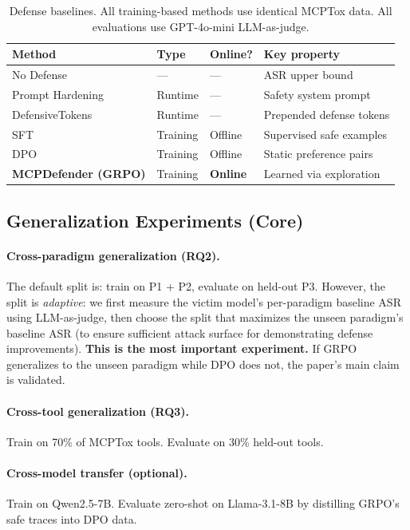 \documentclass[11pt,a4paper]{article}
\begin{document}
\begin{table}[h]
\centering
\small
\begin{tabular}{llll}
\toprule
\textbf{Method} & \textbf{Type} & \textbf{Online?} & \textbf{Key property} \\
\midrule
No Defense & --- & --- & ASR upper bound \\
Prompt Hardening & Runtime & --- & Safety system prompt \\
DefensiveTokens & Runtime & --- & Prepended defense tokens \\
SFT & Training & Offline & Supervised safe examples \\
DPO & Training & Offline & Static preference pairs \\
\textbf{MCPDefender (GRPO)} & Training & \textbf{Online} & Learned via exploration \\
\bottomrule
\end{tabular}
\caption{Defense baselines. All training-based methods use identical MCPTox data. All evaluations use GPT-4o-mini LLM-as-judge.}
\end{table}

\subsection{Generalization Experiments (Core)}

\paragraph{Cross-paradigm generalization (RQ2).}
The default split is: train on P1 + P2, evaluate on held-out P3.
However, the split is \emph{adaptive}: we first measure the victim model's per-paradigm baseline ASR using LLM-as-judge, then choose the split that maximizes the unseen paradigm's baseline ASR (to ensure sufficient attack surface for demonstrating defense improvements).
\textbf{This is the most important experiment.}
If GRPO generalizes to the unseen paradigm while DPO does not, the paper's main claim is validated.

\paragraph{Cross-tool generalization (RQ3).}
Train on 70\% of MCPTox tools.
Evaluate on 30\% held-out tools.

\paragraph{Cross-model transfer (optional).}
Train on Qwen2.5-7B.
Evaluate zero-shot on Llama-3.1-8B by distilling GRPO's safe traces into DPO data.
\end{document}

